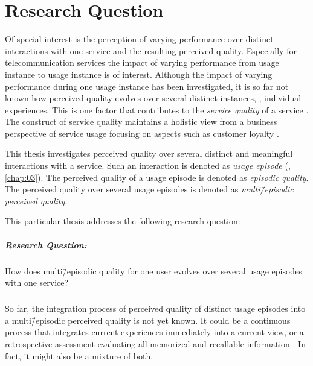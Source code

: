 \section{Research Question}
Of special interest is the perception of varying performance over distinct interactions with one service and the resulting perceived quality.
Especially for telecommunication services the impact of varying performance from usage instance to usage instance is of interest.
Although the impact of varying performance during one usage instance has been investigated, it is so far not known how perceived quality evolves over several distinct instances, \ie, individual experiences.
This is one factor that contributes to the \emph{service quality} of a service \citep[][]{berry_quality_1985, zeithaml_behavioral_1996}.
The construct of service quality maintains a holistic view from a business perspective of service usage focusing on aspects such as customer loyalty \citep{parasuraman_conceptual_1985}.

This thesis investigates perceived quality over several distinct and meaningful interactions with a service.
Such an interaction is denoted as \emph{usage episode} (\cf, \autoref{chap:03}).
The perceived quality of a usage episode is denoted as \emph{episodic quality}.
The perceived quality over several usage episodes is denoted as \emph{multi\=/episodic perceived quality}.

This particular thesis addresses the following research question: 
\subparagraph*{Research Question:}
How does multi\=/episodic quality for one user evolves over several usage episodes with one service?

\subparagraph*{}
So far, the integration process of perceived quality of distinct usage episodes into a multi\=/episodic perceived quality is not yet known.
It could be a continuous process that integrates current experiences immediately into a current view, or a retrospective assessment evaluating all memorized and recallable information \citep[][]{hogarth_order_1992}. 
In fact, it might also be a mixture of both.

